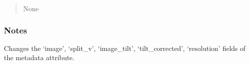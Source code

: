 \documentclass[letterpaper,10pt,english]{sphinxmanual}
\begin{document}
\begin{fulllineitems}
\begin{fulllineitems}
\begin{quote}
\begin{description}
\begin{itemize}
\end{itemize}

\sphinxAtStartPar
None

\end{description}\end{quote}
\subsubsection*{Notes}

\sphinxAtStartPar
Changes the ‘image’, ‘split\_v’, ‘image\_tilt’, ‘tilt\_corrected’, ‘resolution’ fields of the metadata attribute.

\end{fulllineitems}


\end{fulllineitems}

\end{document}
